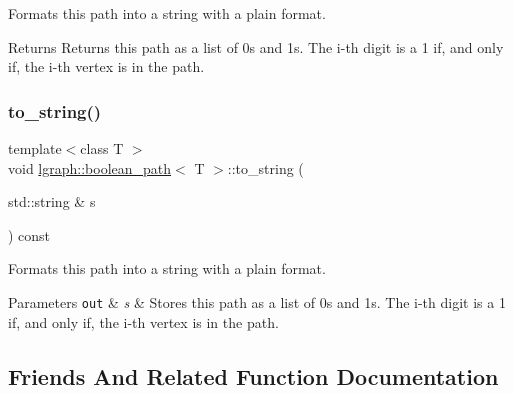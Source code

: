 Formats this path into a string with a plain format. 

\begin{DoxyReturn}{Returns}
Returns this path as a list of 0\textquotesingle{}s and 1\textquotesingle{}s. The i-\/th digit is a 1 if, and only if, the i-\/th vertex is in the path. 
\end{DoxyReturn}
\mbox{\label{classlgraph_1_1boolean__path_a372b30f0cf0f54f5053cf04e06110ec4}} 
\subsubsection{\texorpdfstring{to\+\_\+string()}{to\_string()}\hspace{0.1cm}{\footnotesize\ttfamily [2/2]}}
{\footnotesize\ttfamily template$<$class T $>$ \\
void \hyperlink{classlgraph_1_1boolean__path}{lgraph\+::boolean\+\_\+path}$<$ T $>$\+::to\+\_\+string (\begin{DoxyParamCaption}\item[{std\+::string \&}]{s }\end{DoxyParamCaption}) const}



Formats this path into a string with a plain format. 


\begin{DoxyParams}[1]{Parameters}
\mbox{\tt out}  & {\em s} & Stores this path as a list of 0\textquotesingle{}s and 1\textquotesingle{}s. The i-\/th digit is a 1 if, and only if, the i-\/th vertex is in the path. \\
\hline
\end{DoxyParams}


\subsection{Friends And Related Function Documentation}
\mbox{\label{classlgraph_1_1boolean__path_a3f1b01270c5ffdd0f7ce524dc1e29725}} 
